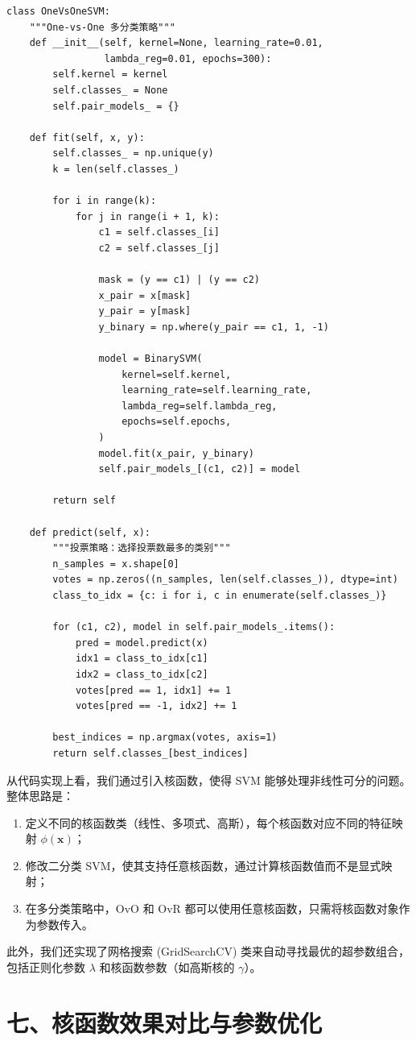 \documentclass[12pt,a4paper]{ctexart}
\begin{document}
	\begin{lstlisting}
class OneVsOneSVM:
	"""One-vs-One 多分类策略"""
	def __init__(self, kernel=None, learning_rate=0.01, 
	             lambda_reg=0.01, epochs=300):
		self.kernel = kernel
		self.classes_ = None
		self.pair_models_ = {}
	
	def fit(self, x, y):
		self.classes_ = np.unique(y)
		k = len(self.classes_)
		
		for i in range(k):
			for j in range(i + 1, k):
				c1 = self.classes_[i]
				c2 = self.classes_[j]
				
				mask = (y == c1) | (y == c2)
				x_pair = x[mask]
				y_pair = y[mask]
				y_binary = np.where(y_pair == c1, 1, -1)
				
				model = BinarySVM(
					kernel=self.kernel,
					learning_rate=self.learning_rate,
					lambda_reg=self.lambda_reg,
					epochs=self.epochs,
				)
				model.fit(x_pair, y_binary)
				self.pair_models_[(c1, c2)] = model
		
		return self
	
	def predict(self, x):
		"""投票策略：选择投票数最多的类别"""
		n_samples = x.shape[0]
		votes = np.zeros((n_samples, len(self.classes_)), dtype=int)
		class_to_idx = {c: i for i, c in enumerate(self.classes_)}
		
		for (c1, c2), model in self.pair_models_.items():
			pred = model.predict(x)
			idx1 = class_to_idx[c1]
			idx2 = class_to_idx[c2]
			votes[pred == 1, idx1] += 1
			votes[pred == -1, idx2] += 1
		
		best_indices = np.argmax(votes, axis=1)
		return self.classes_[best_indices]
	\end{lstlisting}
	
	从代码实现上看，我们通过引入核函数，使得 SVM 能够处理非线性可分的问题。整体思路是：
	\begin{enumerate}
		\item 定义不同的核函数类（线性、多项式、高斯），每个核函数对应不同的特征映射 $\phi(\bm{x})$；
		\item 修改二分类 SVM，使其支持任意核函数，通过计算核函数值而不是显式映射；
		\item 在多分类策略中，OvO 和 OvR 都可以使用任意核函数，只需将核函数对象作为参数传入。
	\end{enumerate}
	
	此外，我们还实现了网格搜索 (GridSearchCV) 类来自动寻找最优的超参数组合，包括正则化参数 $\lambda$ 和核函数参数（如高斯核的 $\gamma$）。
	
	\section*{七、核函数效果对比与参数优化}
	
\end{document}
